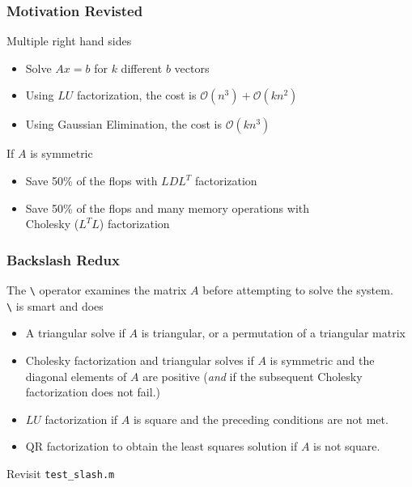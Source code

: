 \documentclass[10pt]{beamer}
\newcommand{\mO}{{\mathcal{O}}}
\begin{document}
\begin{frame}
\frametitle{Motivation Revisted}
Multiple right hand sides
\begin{itemize}
    \item Solve $A x = b$ for $k$ different $b$ vectors
    \item Using $LU$ factorization, the cost is $\mO(n^3) + \mO(k n^2)$
    \item Using Gaussian Elimination, the cost is $\mO(k n^3)$
\end{itemize}
If $A$ is symmetric 
\begin{itemize}
    \item Save 50\% of the flops with $L D L^T$ factorization
    \item Save 50\% of the flops and many memory operations with\\Cholesky ($L^T L$) factorization
\end{itemize}
\end{frame}
\begin{frame}[fragile]
\frametitle{Backslash Redux}

The \verb|\| operator examines the matrix $A$ before
attempting to solve the system.\\
\vspace{10pt}
\verb|\| is smart and does
\begin{itemize}
\item   A triangular solve if $A$ is triangular, or a permutation of
        a triangular matrix
\item   Cholesky factorization and triangular solves if $A$ is
        symmetric and the diagonal elements of $A$ are positive
        (\emph{and} if the subsequent Cholesky factorization does not fail.)
\item   $LU$ factorization if $A$ is square and the preceding conditions
        are not met.
\item   QR factorization to obtain the least squares solution if
        $A$ is not square.
\end{itemize}

\begin{alertblock}{}
Revisit \texttt{test\_slash.m}
\end{alertblock}
\end{frame}


\end{document}
